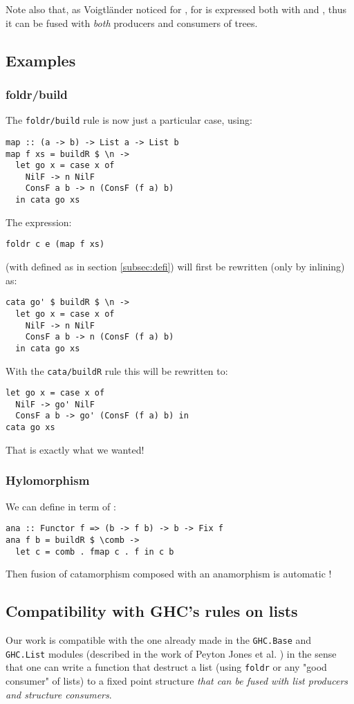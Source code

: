 Note also that, as Voigtländer \cite{Voigtlnder2008TypesFP} noticed for ,  for  is expressed both with  and , thus it can be fused with \emph{both} producers and consumers of trees.

\subsection{Examples}
\subsubsection{foldr/build}
The \verb|foldr/build| rule is now just a particular case, using:
\begin{verbatim}
map :: (a -> b) -> List a -> List b
map f xs = buildR $ \n ->
  let go x = case x of
    NilF -> n NilF
    ConsF a b -> n (ConsF (f a) b)
  in cata go xs
\end{verbatim}

\noindent The expression:
\begin{verbatim}
foldr c e (map f xs)
\end{verbatim}
(with  defined as in section \ref{subsec:defi}) will first be rewritten (only by inlining) as:
\begin{verbatim}
cata go' $ buildR $ \n ->
  let go x = case x of
    NilF -> n NilF
    ConsF a b -> n (ConsF (f a) b)
  in cata go xs
\end{verbatim}

\noindent With the \verb|cata/buildR| rule this will be rewritten to:
\begin{verbatim}
let go x = case x of
  NilF -> go' NilF
  ConsF a b -> go' (ConsF (f a) b) in
cata go xs
\end{verbatim}
That is exactly what we wanted!

\subsubsection{Hylomorphism}
We can define  in term of :
\begin{verbatim}
ana :: Functor f => (b -> f b) -> b -> Fix f
ana f b = buildR $ \comb ->
  let c = comb . fmap c . f in c b
\end{verbatim}

\noindent Then fusion of catamorphism composed with an anamorphism is automatic !

\subsection{Compatibility with GHC's rules on lists}
Our work is compatible with the one already made in the \verb|GHC.Base| and \verb|GHC.List| modules (described in the work of Peyton Jones et al. \cite{playing-by-the-rules-rewriting-as-a-practical-optimisation-technique-in-ghc} ) in the sense that one can write a function that destruct a list (using \verb|foldr| or any "good consumer" of lists) to a fixed point structure \emph{that can be fused with list producers and structure consumers}.

